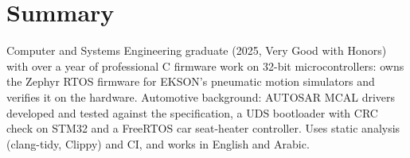 \documentclass[10pt]{article}
\begin{document}

\section*{Summary}
Computer and Systems Engineering graduate (2025, Very Good with Honors) with over a year of professional C firmware work on 32-bit microcontrollers: owns the Zephyr RTOS firmware for EKSON's pneumatic motion simulators and verifies it on the hardware. Automotive background: AUTOSAR MCAL drivers developed and tested against the specification, a UDS bootloader with CRC check on STM32 and a FreeRTOS car seat-heater controller. Uses static analysis (clang-tidy, Clippy) and CI, and works in English and Arabic.
\end{document}
